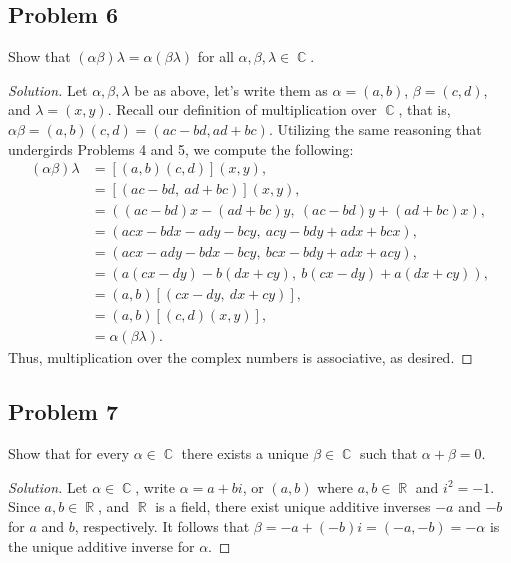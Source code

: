 \documentclass[letterpaper, 12pt]{amsart}
\DeclareMathOperator{\R}{\mathbb{R}}
\DeclareMathOperator{\C}{\mathbb{C}}
\theoremstyle{definition}  %
\begin{document}
		\subsection*{Problem 6}
		Show that $(\alpha \beta)\lambda = \alpha(\beta \lambda)$ for all $\alpha, \beta, \lambda \in \C$.

		\begin{proof}[Solution]
		Let $\alpha,\beta,\lambda$ be as above, let's write them as $\alpha = (a,b)$, $\beta = (c,d)$, and $\lambda = (x,y)$.
		Recall our definition of multiplication over $\C$, that is, $\alpha \beta = (a,b)(c,d) = (ac - bd, ad + bc)$.
		Utilizing the same reasoning that undergirds Problems 4 and 5, we compute the following:
			\begin{align*}
			(\alpha \beta) \lambda &= [(a,b)(c,d)](x,y), \\
			&= [(ac - bd, \ ad + bc)](x,y), \\
			&= ((ac - bd)x - (ad + bc)y, \ (ac - bd)y + (ad + bc)x), \\
			&= (acx - bdx - ady - bcy, \ acy - bdy + adx + bcx), \\
			&= (acx - ady - bdx - bcy, \ bcx - bdy + adx + acy), \\
			&= (a(cx - dy) - b(dx + cy), \ b(cx - dy) + a (dx + cy)), \\
			&= (a,b)[(cx - dy, \ dx + cy)], \\
			&= (a,b)[(c,d)(x,y)], \\
			&= \alpha (\beta \lambda).
			\end{align*}
		Thus, multiplication over the complex numbers is associative, as desired.
			
		\end{proof}

		\subsection*{Problem 7}
		Show that for every $\alpha \in \C$ there exists a unique $\beta \in \C$ such that $\alpha + \beta = 0$.

		\begin{proof}[Solution]
		Let $\alpha \in \C$, write $\alpha = a + bi$, or $(a,b)$ where $a,b \in \R$ and $i^{2} = -1$.
		Since $a,b \in \R$, and $\R$ is a field, there exist unique additive inverses $-a$ and $-b$ for $a$ and $b$, respectively.
		It follows that $\beta = -a + (-b)i = (-a,-b) = - \alpha$ is the unique additive inverse for $\alpha$.
		\end{proof}
\end{document}
